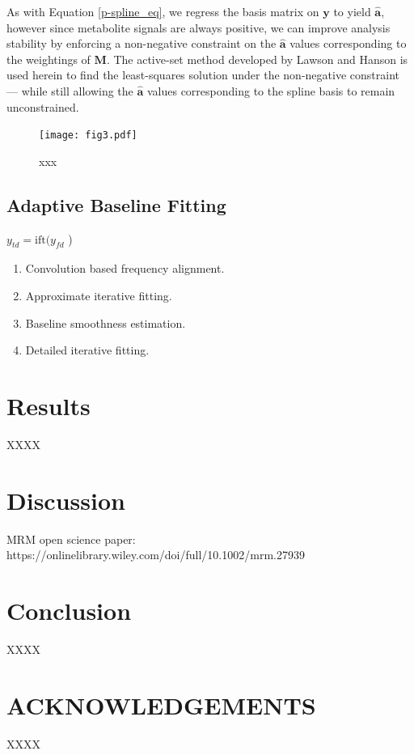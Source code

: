 \documentclass[num-refs]{wiley-article}
\begin{document}
As with Equation \ref{p-spline_eq}, we regress the basis matrix on $\mathbf{y}$ to yield $\hat{\mathbf{a}}$, however since metabolite signals are always positive, we can improve analysis stability by enforcing a non-negative constraint on the $\hat{\mathbf{a}}$ values corresponding to the weightings of $\mathbf{M}$. The active-set method developed by Lawson and Hanson \cite{Lawson1995} is used herein to find the least-squares solution under the non-negative constraint --- while still allowing the $\hat{\mathbf{a}}$ values corresponding to the spline basis to remain unconstrained.

\begin{figure}
  \begin{center}
    \texttt{[image: fig3.pdf]}
    \caption{xxx}
    \label{mrs_bl_simple}
  \end{center}
\end{figure}

\subsection{Adaptive Baseline Fitting}

$y_{\mathit{td}} = \mathrm{ift} ( y_{\mathit{fd}}$ )

\begin{enumerate}
  \item Convolution based frequency alignment.
  \item Approximate iterative fitting.
  \item Baseline smoothness estimation.
  \item Detailed iterative fitting.
\end{enumerate}

\section{Results}
XXXX

\section{Discussion}
MRM open science paper: https://onlinelibrary.wiley.com/doi/full/10.1002/mrm.27939

\cite{Stikov2019}


\cite{OSullivan1986}



\section{Conclusion}
XXXX

\section*{ACKNOWLEDGEMENTS}
XXXX



\clearpage
\listoffigures
\end{document}
